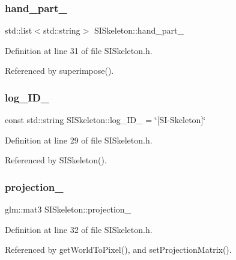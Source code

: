 \subsubsection{\texorpdfstring{hand\+\_\+part\+\_\+}{hand\_part\_}}
{\footnotesize\ttfamily std\+::list$<$std\+::string$>$ S\+I\+Skeleton\+::hand\+\_\+part\+\_\+\hspace{0.3cm}{\ttfamily [private]}}



Definition at line 31 of file S\+I\+Skeleton.\+h.



Referenced by superimpose().

\mbox{\label{classSISkeleton_a6d4a9061880520792f467eb8e7faa66b}} 
\subsubsection{\texorpdfstring{log\+\_\+\+I\+D\+\_\+}{log\_ID\_}}
{\footnotesize\ttfamily const std\+::string S\+I\+Skeleton\+::log\+\_\+\+I\+D\+\_\+ = \char`\"{}\mbox{[}SI-\/Skeleton\mbox{]}\char`\"{}\hspace{0.3cm}{\ttfamily [private]}}



Definition at line 29 of file S\+I\+Skeleton.\+h.



Referenced by S\+I\+Skeleton().

\mbox{\label{classSISkeleton_a1ac569493d56bf099bdc364318ad5622}} 
\subsubsection{\texorpdfstring{projection\+\_\+}{projection\_}}
{\footnotesize\ttfamily glm\+::mat3 S\+I\+Skeleton\+::projection\+\_\+\hspace{0.3cm}{\ttfamily [private]}}



Definition at line 32 of file S\+I\+Skeleton.\+h.



Referenced by get\+World\+To\+Pixel(), and set\+Projection\+Matrix().

